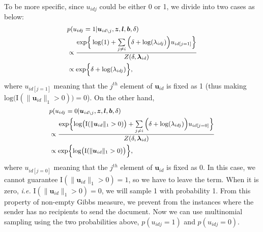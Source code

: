 \documentclass[twoside]{article}
\begin{document}
  	  To be more specific, since $u_{idj}$ could be either 0 or 1, we divide into two cases as below:
  	  \begin{equation*}
  	    	 \footnotesize
  	  \begin{aligned}
  	  &p(u_{idj}=1| \boldsymbol{u}_{id\backslash j}, \boldsymbol{z},\boldsymbol{l},\boldsymbol{b}, \delta)\\& \propto \frac{\mbox{exp}\Big\{\log(1) +\sum\limits_{j \neq i } \Big(\delta+\mbox{log}(\lambda_{idj})\Big){u}_{id[j=1]}\Big\}}{Z(\delta,\boldsymbol{\lambda}_{id})}  
  	  \\& \propto \mbox{exp}\Big\{\delta+\mbox{log}(\lambda_{idj})\Big\},
  	  \end{aligned}\label{eqn:uidj1}
  	  \end{equation*}
  	  where ${u}_{id[j=1]}$ meaning that the $j^{th}$ element of $\boldsymbol{u}_{id}$ is fixed as 1 (thus making $\mbox{log}\big(\text{I}(\lVert\boldsymbol{u}_{id}\rVert_1 > 0 )\big) = 0$). On the other hand, 
  	  \begin{equation*}
  	    	 \footnotesize
  	  \begin{aligned}
  	  &p(u_{idj}=0| \boldsymbol{u}_{id\backslash j}, \boldsymbol{z},\boldsymbol{l},\boldsymbol{b}, \delta)\\& \propto \frac{ \mbox{exp}\Big\{\mbox{log}\big(\text{I}(\lVert\boldsymbol{u}_{id}\rVert_1 > 0 )\big) +\sum\limits_{j \neq i } \Big(\delta+\mbox{log}(\lambda_{idj})\Big){u}_{id[j=0]}\Big\} }{Z(\delta,\boldsymbol{\lambda}_{id})}
  	  \\& \propto \mbox{exp}\Big\{\mbox{log}\big(\text{I}(\lVert\boldsymbol{u}_{id}\rVert_1 > 0 )\big) \Big\},
  	  \end{aligned}\label{eqn:uidj0}
  	  \end{equation*}  
  	  where ${u}_{id[j=0]}$ meaning that the $j^{th}$ element of $\boldsymbol{u}_{id}$ is fixed as 0. In this case, we cannot guarantee $\text{I}(\lVert\boldsymbol{u}_{id}\rVert_1 > 0 )= 1$, so we have to leave the term. When it is zero, \textit{i.e.} $\text{I}(\lVert\boldsymbol{u}_{id}\rVert_1 > 0 )= 0$, we will sample 1 with probability 1. From this property of non-empty Gibbs measure, we prevent from the instances where the sender has no recipients to send the document. Now we can use multinomial sampling using the two probabilities above, $p(u_{idj}=1)$ and $p(u_{idj}=0)$.
  	  
\end{document}
